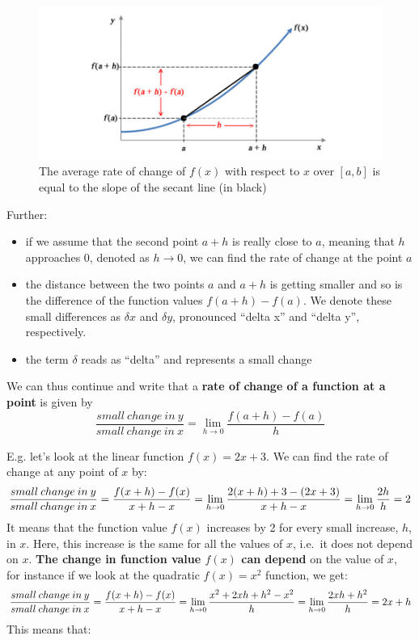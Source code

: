 \documentclass[
]{book}
\providecommand{\tightlist}{%
  \setlength{\itemsep}{0pt}\setlength{\parskip}{0pt}}
\theoremstyle{definition}
\theoremstyle{definition}
\theoremstyle{definition}
\theoremstyle{remark}
\begin{document}
\begin{figure}

{\centering \includegraphics{figures/precourse/math-differentiation-02} 

}

\caption{The average rate of change of $f(x)$ with respect to $x$ over $[a, b]$ is equal to the slope of the secant line (in black)}\label{fig:diff-02}
\end{figure}

Further:

\begin{itemize}
\tightlist
\item
  if we assume that the second point \(a+h\) is really close to \(a\), meaning that \(h\) approaches 0, denoted as \(h \rightarrow 0\), we can find the rate of change at the point \(a\)
\item
  the distance between the two points \(a\) and \(a+h\) is getting smaller and so is the difference of the function values \(f(a+h) - f(a)\). We denote these small differences as \(\delta x\) and \(\delta y\), pronounced ``delta x'' and ``delta y'', respectively.
\item
  the term \(\delta\) reads as ``delta'' and represents a small change
\end{itemize}

We can thus continue and write that a \textbf{rate of change of a function at a point} is given by
\begin{equation}
\frac{small\:change\:in\:y}{small\:change\:in\:x} = \lim_{h\to0}\frac{f(a+h)-f(a)}{h}
\label{eq:diff-point}
\end{equation}

E.g. let's look at the linear function \(f(x) = 2x+3\). We can find the rate of change at any point of \(x\) by:
\[\frac{small\:change\:in\:y}{small\:change\:in\:x} = \\\frac{f(x+h)-f(x)}{x+h-x}= \lim_{h\to0}\frac{2(x+h)+3-(2x+3)}{x+h-x}=\lim_{h\to0}\frac{2h}{h}=2\]
It means that the function value \(f(x)\) increases by 2 for every small increase, \(h\), in \(x\). Here, this increase is the same for all the values of \(x\), i.e.~it does not depend on \(x\). \textbf{The change in function value \(f(x)\) can depend} on the value of \(x\), for instance if we look at the quadratic \(f(x)=x^2\) function, we get:
\[\frac{small\:change\:in\:y}{small\:change\:in\:x} = \\ \frac{f(x+h)-f(x)}{x+h-x}=\lim_{h\to0}\frac{x^2+2xh+h^2-x^2}{h}=\lim_{h\to0}\frac{2xh+h^2}{h}=2x+h\]
This means that:
\end{document}
